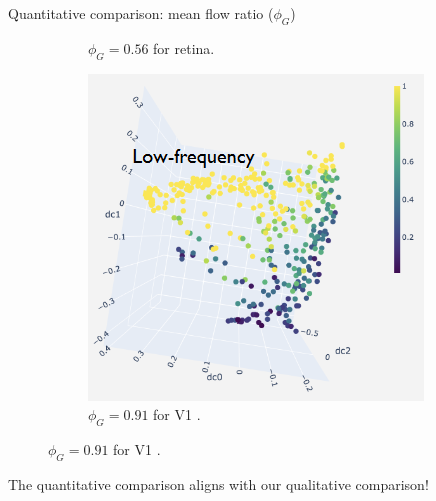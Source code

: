 \documentclass[xcolor={dvipsnames,svgnames}]{beamer}
\begin{document}
\begin{frame}{Quantitative comparison: mean flow ratio ($\phi_G$)}
\begin{figure}[H]
\begin{subfigure}[b]{0.3\textwidth}
        \caption{$\phi_G = 0.56$ for retina.}
\end{subfigure}
\hfill
\begin{subfigure}[b]{0.3\textwidth}
        \includegraphics[width=\textwidth]{figures/biological/v1-manifold-luciano.PNG}
        \caption{$\phi_G = 0.91$ for V1 \cite{dyballa_manifold_2021}.}
\end{subfigure}
\end{figure} 
The quantitative comparison aligns with our qualitative comparison!
\end{frame}
\end{document}
